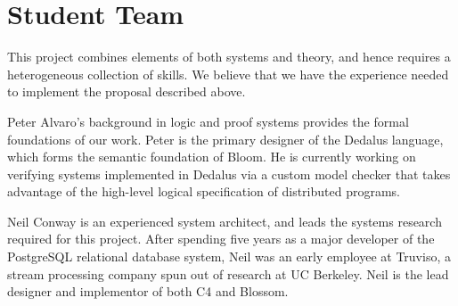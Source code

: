 \section{Student Team}
This project combines elements of both systems and theory, and hence requires a
heterogeneous collection of skills. We believe that we have the experience needed
to implement the proposal described above.

Peter Alvaro's background in logic and proof systems provides the formal
foundations of our work.  Peter is the primary designer of the Dedalus language,
which forms the semantic foundation of Bloom.  He is currently working on
verifying systems implemented in Dedalus via a custom model checker that
takes advantage of the high-level logical specification of distributed programs.

Neil Conway is an experienced system architect, and leads the systems research
required for this project. After spending five years as a major developer of the
PostgreSQL relational database system, Neil was an early employee at Truviso, a
stream processing company spun out of research at UC Berkeley. Neil is the lead
designer and implementor of both C4 and Blossom.
